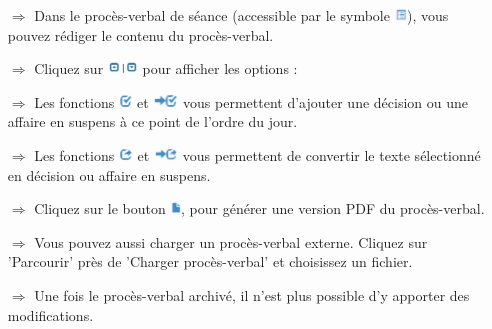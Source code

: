\documentclass{article}
\begin{document}
\begin{multicols}{2}

\begin{tcolorbox}[colback=blue!5,colframe=blue!40!black,title=Rédiger le procès-verbal]
\begin{itemize}
  \item[$\Longrightarrow$] Dans le procès-verbal de séance (accessible par le symbole \includegraphics[height=10pt]{Icons/Listensymbol.jpg}), vous pouvez rédiger le contenu du procès-verbal.
	\item[$\Longrightarrow$] Cliquez sur \includegraphics[height=10pt]{Icons/Pfeil_auf-ab.jpg} pour afficher les options :
  \item[$\Longrightarrow$] Les fonctions \includegraphics[height=10pt]{Icons/Gutzeichen_Rahmen.jpg} et \includegraphics[height=10pt]{Icons/Pfeil_Gutzeichen.jpg} vous permettent d'ajouter une décision ou une affaire en suspens à ce point de l'ordre du jour.
	  \item[$\Longrightarrow$] Les fonctions \includegraphics[height=10pt]{Icons/Pfeil_aus_Box.jpg} et \includegraphics[height=10pt]{Icons/Pfeil_Pfeil_aus_Box.jpg} vous permettent de convertir le texte sélectionné en décision ou affaire en suspens.
  \item[$\Longrightarrow$] Cliquez sur le bouton \includegraphics[height=10pt]{Icons/Blattsymbol.jpg}, pour générer une version PDF du procès-verbal.
	\item[$\Longrightarrow$] Vous pouvez aussi charger un procès-verbal externe. Cliquez sur 'Parcourir' près de 'Charger procès-verbal' et choisissez un fichier.
	\item[$\Longrightarrow$] Une fois le procès-verbal archivé, il n'est plus possible d'y apporter des modifications.
\end{itemize}
\end{tcolorbox}



\end{multicols}
\end{document}
